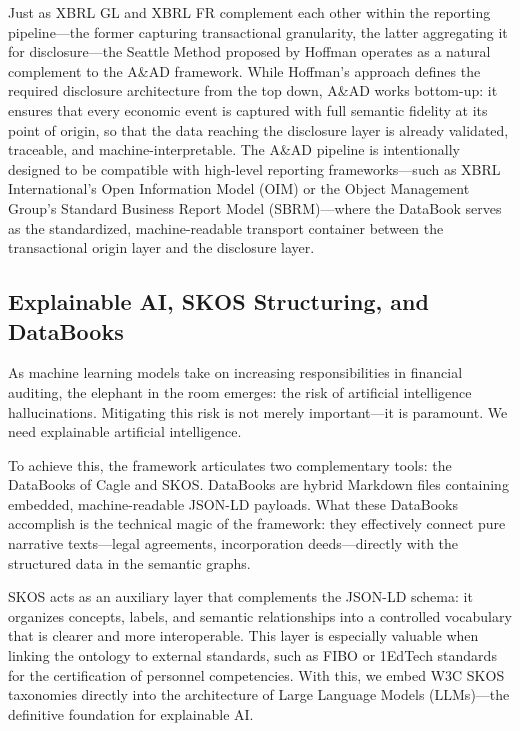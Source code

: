 \documentclass[12pt, a4paper]{article}
\begin{document}
Just as XBRL GL and XBRL FR complement each other within the reporting pipeline---the former capturing transactional granularity, the latter aggregating it for disclosure---the Seattle Method proposed by Hoffman \cite{hoffman2025} operates as a natural complement to the A\&AD framework. While Hoffman's approach defines the required disclosure architecture from the top down, A\&AD works bottom-up: it ensures that every economic event is captured with full semantic fidelity at its point of origin, so that the data reaching the disclosure layer is already validated, traceable, and machine-interpretable. The A\&AD pipeline is intentionally designed to be compatible with high-level reporting frameworks---such as XBRL International's Open Information Model (OIM) or the Object Management Group's Standard Business Report Model (SBRM)---where the DataBook serves as the standardized, machine-readable transport container between the transactional origin layer and the disclosure layer.

\subsection{Explainable AI, SKOS Structuring, and DataBooks}

As machine learning models take on increasing responsibilities in financial auditing, the elephant in the room emerges: the risk of artificial intelligence hallucinations. Mitigating this risk is not merely important---it is paramount. We need explainable artificial intelligence.

To achieve this, the framework articulates two complementary tools: the DataBooks of Cagle \cite{cagle2026} and SKOS. DataBooks are hybrid Markdown files containing embedded, machine-readable JSON-LD payloads. What these DataBooks accomplish is the technical magic of the framework: they effectively connect pure narrative texts---legal agreements, incorporation deeds---directly with the structured data in the semantic graphs.

SKOS acts as an auxiliary layer that complements the JSON-LD schema: it organizes concepts, labels, and semantic relationships into a controlled vocabulary that is clearer and more interoperable. This layer is especially valuable when linking the ontology to external standards, such as FIBO or 1EdTech standards for the certification of personnel competencies. With this, we embed W3C SKOS \cite{w3cskos} taxonomies directly into the architecture of Large Language Models (LLMs)---the definitive foundation for explainable AI.
\end{document}
